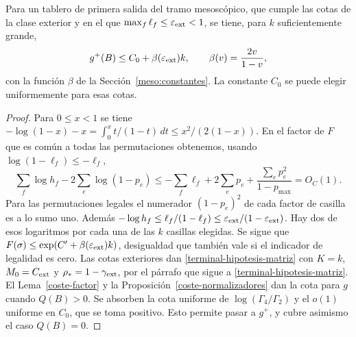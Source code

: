 \begin{corolario}\label{coste-debil}
Para un tablero de primera salida del tramo mesoscópico, que cumple las cotas de la clase exterior y
en el que $\max_f\ell_f\le\varepsilon_{\rm ext}<1$, se tiene, para $k$ suficientemente grande,
\[
 g^+(B)\le C_0+\beta(\varepsilon_{\rm ext})k,\qquad
 \beta(v)=\frac{2v}{1-v},
\]
con la función $\beta$ de la Sección~\ref{meso:constantes}. La constante $C_0$ se puede elegir
uniformemente para esas cotas.
\end{corolario}
\begin{proof}
Para $0\le x<1$ se tiene $-\log(1-x)-x=\int_0^x t/(1-t)\,dt\le x^2/(2(1-x))$. En el factor de $F$ que
es común a todas las permutaciones obtenemos, usando $\log(1-\ell_f)\le-\ell_f$,
\[
 \sum_f\log h_f-2\sum_e\log(1-p_e)
 \le-\sum_f\ell_f+2\sum_ep_e+
       \frac{\sum_ep_e^2}{1-p_{\max}}
 =O_C(1).
\]
Para las permutaciones legales el numerador $(1-p_e)^2$ de cada factor de casilla es a lo sumo uno.
Además $-\log h_f\le\ell_f/(1-\ell_f)\le\varepsilon_{\rm ext}/(1-\varepsilon_{\rm ext})$. Hay dos de
esos logaritmos por cada una de las $k$ casillas elegidas. Se sigue que
$F(\sigma)\le\exp(C'+\beta(\varepsilon_{\rm ext})k)$, desigualdad que también vale si el indicador de
legalidad es cero. Las cotas exteriores dan \eqref{terminal-hipotesis-matriz} con $K=k$,
$M_0=C_{\rm ext}$ y $\rho_*=1-\gamma_{\rm ext}$, por el párrafo que sigue a
\eqref{terminal-hipotesis-matriz}. El Lema~\ref{coste-factor} y la
Proposición~\ref{coste-normalizadores} dan la cota
para $g$ cuando $Q(B)>0$. Se absorben la cota uniforme de $\log(\Gamma_4/\Gamma_2)$ y el $o(1)$
uniforme en $C_0$, que se toma positivo. Esto permite pasar a $g^+$, y cubre asimismo el caso
$Q(B)=0$.
\end{proof}
